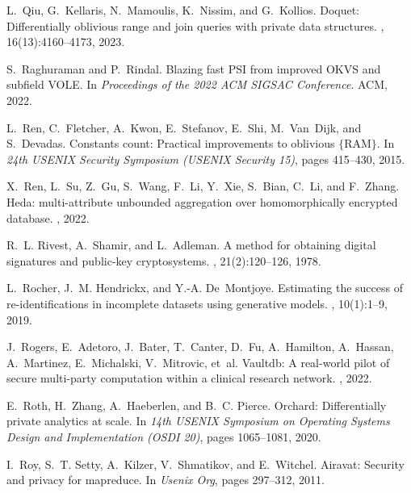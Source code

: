 \documentclass[11pt]{article}
\begin{document}
\begin{thebibliography}{140}
\begin{small}
L.~Qiu, G.~Kellaris, N.~Mamoulis, K.~Nissim, and G.~Kollios.
\newblock Doquet: Differentially oblivious range and join queries with private
  data structures.
, 16(13):4160--4173, 2023.

S.~Raghuraman and P.~Rindal.
\newblock Blazing fast {PSI} from improved {OKVS} and subfield {VOLE}.
\newblock In {\em Proceedings of the 2022 ACM SIGSAC Conference}. ACM, 2022.

L.~Ren, C.~Fletcher, A.~Kwon, E.~Stefanov, E.~Shi, M.~Van~Dijk, and S.~Devadas.
\newblock Constants count: Practical improvements to oblivious $\{$RAM$\}$.
\newblock In {\em 24th USENIX Security Symposium (USENIX Security 15)}, pages
  415--430, 2015.

X.~Ren, L.~Su, Z.~Gu, S.~Wang, F.~Li, Y.~Xie, S.~Bian, C.~Li, and F.~Zhang.
\newblock Heda: multi-attribute unbounded aggregation over homomorphically
  encrypted database.
, 2022.

R.~L. Rivest, A.~Shamir, and L.~Adleman.
\newblock A method for obtaining digital signatures and public-key
  cryptosystems.
, 21(2):120--126, 1978.

L.~Rocher, J.~M. Hendrickx, and Y.-A. De~Montjoye.
\newblock Estimating the success of re-identifications in incomplete datasets
  using generative models.
, 10(1):1--9, 2019.

J.~Rogers, E.~Adetoro, J.~Bater, T.~Canter, D.~Fu, A.~Hamilton, A.~Hassan,
  A.~Martinez, E.~Michalski, V.~Mitrovic, et~al.
\newblock Vaultdb: A real-world pilot of secure multi-party computation within
  a clinical research network.
, 2022.

E.~Roth, H.~Zhang, A.~Haeberlen, and B.~C. Pierce.
\newblock Orchard: Differentially private analytics at scale.
\newblock In {\em 14th USENIX Symposium on Operating Systems Design and
  Implementation (OSDI 20)}, pages 1065--1081, 2020.

I.~Roy, S.~T. Setty, A.~Kilzer, V.~Shmatikov, and E.~Witchel.
\newblock Airavat: Security and privacy for mapreduce.
\newblock In {\em Usenix Org}, pages 297--312, 2011.


\end{small}
\end{thebibliography}
\end{document}
